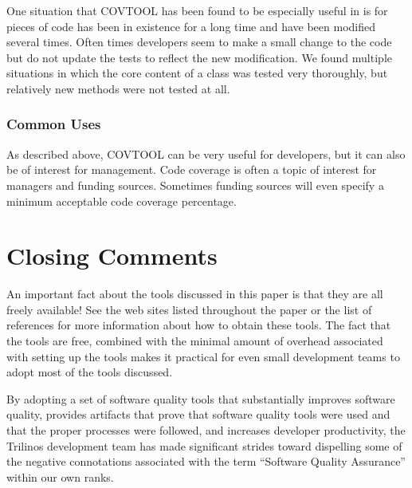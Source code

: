 \documentclass[12pt,relax]{article}
\begin{document}
One situation that COVTOOL has been found to be especially useful in is for 
pieces of code has been in existence for a long time and have been modified 
several times.  Often times developers seem to make a small change to the code 
but do not update the tests to reflect the new modification.  We found 
multiple situations in which the core content of a class was tested very 
thoroughly, but relatively new methods were not tested at all.

\subsubsection{Common Uses}

As described above, COVTOOL can be very useful for developers, but it can also
be of interest for management.  Code coverage is often a topic of interest for 
managers and funding sources.  Sometimes funding sources will even specify a 
minimum acceptable code coverage percentage.


\section{Closing Comments}

An important fact about the tools discussed in this paper is that they are all 
freely available!  See the web sites listed throughout the paper or the list 
of references for more information about how to obtain these tools.  The fact 
that the tools are free, combined with the minimal amount of overhead 
associated with setting up the tools makes it practical for even small 
development teams to adopt most of the tools discussed.  

By adopting a set of software quality tools that substantially improves
software quality, provides artifacts that prove that software quality tools 
were used and that the proper processes were followed, and increases developer
productivity, the Trilinos development team has made significant strides 
toward dispelling some of the negative connotations associated with the term
``Software Quality Assurance'' within our own ranks.

\clearpage


%

\end{document}
